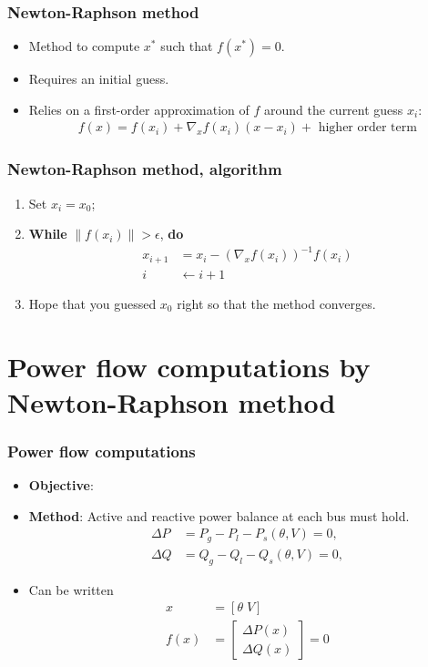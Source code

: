 \documentclass{beamer}
\newcommand\norm[1]{\left\lVert#1\right\rVert}
\begin{document}
\begin{frame}
  \frametitle{Newton-Raphson method}
  \begin{itemize}
  \item Method to compute $x^{*}$ such that $f(x^{*}) = 0$.
  \item Requires an initial guess.
  \item Relies on a first-order approximation of $f$ around the current guess $x_i$:
    \begin{align}
      f(x) = f(x_i) + \nabla_x f(x_i) (x-x_i) + \text{ higher order term}
    \end{align}
  \end{itemize}
\end{frame}

\begin{frame}
  \frametitle{Newton-Raphson method, algorithm}
  \begin{enumerate}
  \item Set $x_i = x_0$;
  \item \textbf{While} $\norm{f(x_i)}> \epsilon$, \textbf{do}
    \begin{align*}
      x_{i+1} &= x_i - \left(\nabla_x f(x_i) \right)^{-1} f(x_i)\\
      i &\leftarrow i+1
    \end{align*}
  \item Hope that you guessed $x_0$ right so that the method converges.
  \end{enumerate}
\end{frame}

\section[Power flow]{Power flow computations by Newton-Raphson method}

\begin{frame}
  \frametitle{Power flow computations}
  \begin{itemize}
  \item \textbf{Objective}:  
  \item<3-> \textbf{Method}: Active and reactive power balance at each bus must hold.
    \begin{align}
      \Delta P &= P_g - P_l - P_s(\theta,V) = 0,\\
      \Delta Q &= Q_g - Q_l - Q_s(\theta,V) = 0,
    \end{align}
  \item<4> Can be written
    \begin{align}
      x &= [\theta \; V] \\
      f(x) &= \begin{bmatrix}
      \Delta P(x)\\
      \Delta Q(x)
      \end{bmatrix}=0
    \end{align}
  \end{itemize}
\end{frame}
\end{document}
